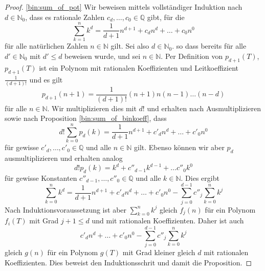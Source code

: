 \documentclass[../Analysis1_script.tex]{subfiles}
\begin{document}
\begin{proof}\ref{bin:sum_of_pot}
	Wir beweisen mittels vollständiger Induktion nach $d \in \mathbb{N}_0$, dass es rationale Zahlen $c_d, \ldots, c_0 \in \mathbb{Q}$ gibt, für die 
	\[\sum_{k=1}^{n}k^d = \frac{1}{d+1}n^{d+1} + c_{d}n^{d} + \dots + c_{0}n^{0}\]
	für alle natürlichen Zahlen $n \in \mathbb{N}$ gilt. Sei also $d \in \mathbb{N}_0$. so dass bereits für alle $d' \in \mathbb{N}_0$ mit $d' \leq d$ beweisen wurde, und sei $n \in \mathbb{N}$. Per Definition von $p_{d+1}(T)$, $p_{d+1}(T)$  ist ein Polynom mit rationalen Koeffizienten und Leitkoeffizient $\frac{1}{(d+1)!}$ und es gilt
	\[p_{d+1}(n+1) = \frac{1}{(d+1)!}(n+1)n(n-1)\ldots (n-d)\]
	für alle $n \in \mathbb{N}$. Wir multiplizieren dies mit $d!$ und erhalten nach Ausmultiplizieren sowie nach Proposition \ref{bin:sum_of_binkoeff}, dass
	\[d! \sum_{k=0}^{n}p_{d}(k) = \frac{1}{d+1}n^{d+1} + c'_{d}n^{d} + \dots + c'_{0}n^{0}\]
	für gewisse $c'_{d}, \ldots, c'_{0} \in \mathbb{Q}$ und alle $n \in \mathbb{N}$ gilt. Ebenso können wir aber $p_d$ ausmultiplizieren und erhalten analog
	\[d!p_{d}(k) = k^d + c''_{d-1}k^{d-1} + \dots c''_{0}k^{0}\]
	für gewisse Konstanten $c''_{d-1}, \ldots, c''_{0} \in \mathbb{Q}$ und alle $k \in \mathbb{N}$. Dies ergibt 
	\[\sum_{k=0}^{n}k^d = \frac{1}{d+1}n^{d+1} + c'_{d}n^{d} + \dots + c'_{0}n^{0} - \sum_{j=0}^{d-1}c''_{j}\sum_{k=0}^{n}k^{j}\]
	Nach Induktionsvoraussetzung ist aber $\sum_{k=0}^{n}k^{j}$ gleich $f_{j}(n)$ für ein Polynom $f_{i}(T)$ mit Grad $j + 1 \leq d$ und mit rationalen Koeffizienten. Daher ist auch 
	\[c'_{d}n^{d} + \dots + c'_{0}n^{0} - \sum_{j=0}^{d-1}c''_{j}\sum_{k=0}^{n}k^{j}\]
	gleich $g(n)$ für ein Polynom $g(T)$ mit Grad kleiner gleich $d$ mit rationalen Koeffizienten. Dies beweist den Induktionsschrit und damit die Proposition.
\end{proof}
\end{document}

